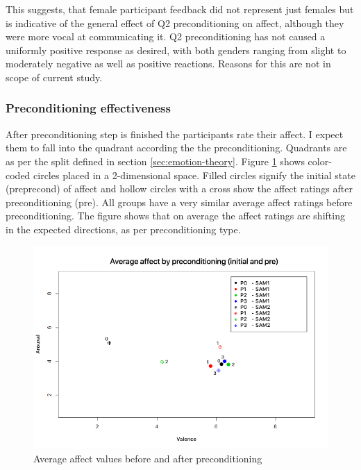 		This suggests, that female participant feedback did not represent just females but is indicative of the general effect of Q2 preconditioning on affect, although they were more vocal at communicating it. Q2 preconditioning has not caused a uniformly positive response as desired, with both genders ranging from slight to moderately negative as well as positive reactions. 
		Reasons for this are not in scope of current study. %
		
		\subsubsection{Preconditioning effectiveness}
		
		After preconditioning step is finished the participants rate their affect. I expect them to fall into the quadrant according the the preconditioning. Quadrants are as per the split defined in section \ref{sec:emotion-theory}. Figure \ref{fig:after-preconditioning-avg} shows color-coded circles placed in a 2-dimensional space. Filled circles signify the initial state (preprecond) of affect and hollow circles with a cross show the affect ratings after preconditioning (pre). All groups have a very similar average affect ratings before preconditioning.
		The figure shows that on average the affect ratings are shifting in the expected directions, as per preconditioning type. 
		
\begin{figure}[h!]
	\centering
	\includegraphics[width=1\linewidth]{graphics/after-preconditioning-avg}
	\caption[Avg Affect]{Average affect values before and after preconditioning}
	\label{fig:after-preconditioning-avg}
\end{figure}
		
